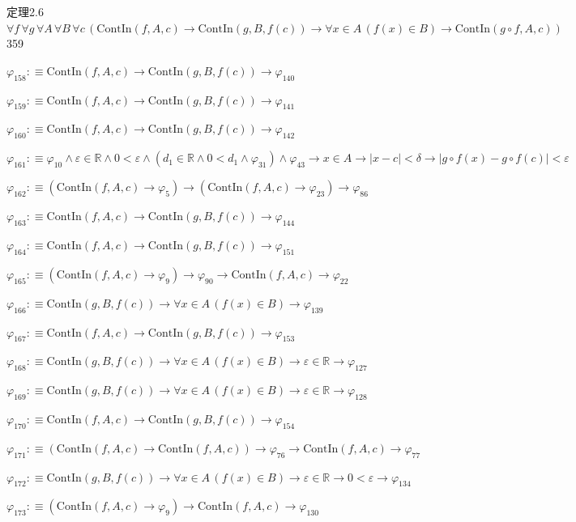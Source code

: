 \begin{fullproof}{定理2.6}{$\forall f\,\forall g\,\forall A\,\forall B\,\forall c\,(\mathrm{ContIn}(f,A,c) \to \mathrm{ContIn}(g,B,f(c)) \to \forall x \in A\,(f(x) \in B) \to \mathrm{ContIn}(g \circ f,A,c))$}{359}
\begin{abbrevlist}
\item $\varphi_{158} :\equiv \mathrm{ContIn}(f,A,c) \to \mathrm{ContIn}(g,B,f(c)) \to \varphi_{140}$
\item $\varphi_{159} :\equiv \mathrm{ContIn}(f,A,c) \to \mathrm{ContIn}(g,B,f(c)) \to \varphi_{141}$
\item $\varphi_{160} :\equiv \mathrm{ContIn}(f,A,c) \to \mathrm{ContIn}(g,B,f(c)) \to \varphi_{142}$
\item $\varphi_{161} :\equiv \varphi_{10} \land \varepsilon \in \mathbb{R} \land 0 < \varepsilon \land (d_{1} \in \mathbb{R} \land 0 < d_{1} \land \varphi_{31}) \land \varphi_{43} \to x \in A \to \lvert x - c \rvert < \delta \to \lvert g \circ f(x) - g \circ f(c) \rvert < \varepsilon$
\item $\varphi_{162} :\equiv (\mathrm{ContIn}(f,A,c) \to \varphi_{5}) \to (\mathrm{ContIn}(f,A,c) \to \varphi_{23}) \to \varphi_{86}$
\item $\varphi_{163} :\equiv \mathrm{ContIn}(f,A,c) \to \mathrm{ContIn}(g,B,f(c)) \to \varphi_{144}$
\item $\varphi_{164} :\equiv \mathrm{ContIn}(f,A,c) \to \mathrm{ContIn}(g,B,f(c)) \to \varphi_{151}$
\item $\varphi_{165} :\equiv (\mathrm{ContIn}(f,A,c) \to \varphi_{9}) \to \varphi_{90} \to \mathrm{ContIn}(f,A,c) \to \varphi_{22}$
\item $\varphi_{166} :\equiv \mathrm{ContIn}(g,B,f(c)) \to \forall x \in A\,(f(x) \in B) \to \varphi_{139}$
\item $\varphi_{167} :\equiv \mathrm{ContIn}(f,A,c) \to \mathrm{ContIn}(g,B,f(c)) \to \varphi_{153}$
\item $\varphi_{168} :\equiv \mathrm{ContIn}(g,B,f(c)) \to \forall x \in A\,(f(x) \in B) \to \varepsilon \in \mathbb{R} \to \varphi_{127}$
\item $\varphi_{169} :\equiv \mathrm{ContIn}(g,B,f(c)) \to \forall x \in A\,(f(x) \in B) \to \varepsilon \in \mathbb{R} \to \varphi_{128}$
\item $\varphi_{170} :\equiv \mathrm{ContIn}(f,A,c) \to \mathrm{ContIn}(g,B,f(c)) \to \varphi_{154}$
\item $\varphi_{171} :\equiv (\mathrm{ContIn}(f,A,c) \to \mathrm{ContIn}(f,A,c)) \to \varphi_{76} \to \mathrm{ContIn}(f,A,c) \to \varphi_{77}$
\item $\varphi_{172} :\equiv \mathrm{ContIn}(g,B,f(c)) \to \forall x \in A\,(f(x) \in B) \to \varepsilon \in \mathbb{R} \to 0 < \varepsilon \to \varphi_{134}$
\item $\varphi_{173} :\equiv (\mathrm{ContIn}(f,A,c) \to \varphi_{9}) \to \mathrm{ContIn}(f,A,c) \to \varphi_{130}$

\end{abbrevlist}
\end{fullproof}
